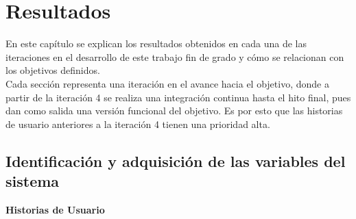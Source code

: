 \chapter{Resultados}
\label{cap:Resultados}
En este capítulo se explican los resultados obtenidos en cada una de las iteraciones en el desarrollo de este trabajo fin de grado y cómo se relacionan con los objetivos definidos.\\

Cada sección representa una iteración en el avance hacia el objetivo, donde a partir de la iteración 4 se realiza una integración continua hasta el hito final, pues dan como salida una versión funcional del objetivo. Es por esto que las historias de usuario anteriores a la iteración 4 tienen una prioridad alta.

\section{Identificación y adquisición de las variables del sistema}
\textbf{Historias de Usuario}\\

